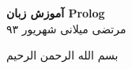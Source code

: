 \begin{titlepage}
\begin{center}
\vspace*{2cm}
\huge
\textbf{آموزش زبان Prolog} \\
\vspace{1.5cm}
\textsc{مرتضی میلانی}
\vfill
\small
شهریور ۹۳
\end{center}
\end{titlepage}
\newpage
\thispagestyle{empty}
{\Huge\centerline{
بسم الله الرحمن الرحیم}}
\clearpage
{}
\tableofcontents{}